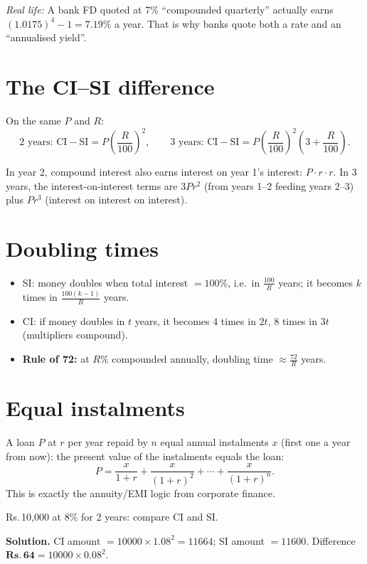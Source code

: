 \documentclass[11pt,a4paper,openany]{report}
\newcommand{\Rs}{Rs.\,}
\begin{document}
\textit{Real life:} A bank FD quoted at 7\% ``compounded quarterly'' actually earns $(1.0175)^4-1=7.19\%$ a year.
That is why banks quote both a rate and an ``annualised yield''.

\section{The CI--SI difference}
On the same $P$ and $R$:
\[\text{2 years: } \text{CI}-\text{SI}=P\left(\frac R{100}\right)^2,\qquad
\text{3 years: } \text{CI}-\text{SI}=P\left(\frac R{100}\right)^2\left(3+\frac R{100}\right).\]
\begin{why}
In year 2, compound interest also earns interest on year 1's interest: $P\cdot r\cdot r$. In 3 years, the
interest-on-interest terms are $3Pr^2$ (from years 1--2 feeding years 2--3) plus $Pr^3$ (interest on interest on interest).
\end{why}

\section{Doubling times}
\begin{itemize}[nosep]
\item SI: money doubles when total interest $=100\%$, i.e.\ in $\frac{100}{R}$ years; it becomes $k$ times in $\frac{100(k-1)}R$ years.
\item CI: if money doubles in $t$ years, it becomes 4 times in $2t$, 8 times in $3t$ (multipliers compound).
\item \textbf{Rule of 72:} at $R\%$ compounded annually, doubling time $\approx\frac{72}{R}$ years.
\end{itemize}

\section{Equal instalments}
A loan $P$ at $r$ per year repaid by $n$ equal annual instalments $x$ (first one a year from now):
the present value of the instalments equals the loan:
\[P=\frac x{1+r}+\frac x{(1+r)^2}+\cdots+\frac x{(1+r)^n}.\]
This is exactly the annuity/EMI logic from corporate finance.

\begin{example}
\Rs10,000 at 8\% for 2 years: compare CI and SI.

\textbf{Solution.} CI amount $=10000\times1.08^2=11664$; SI amount $=11600$. Difference $\mathbf{\Rs64}=10000\times0.08^2$. \checkmark
\end{example}
\end{document}
